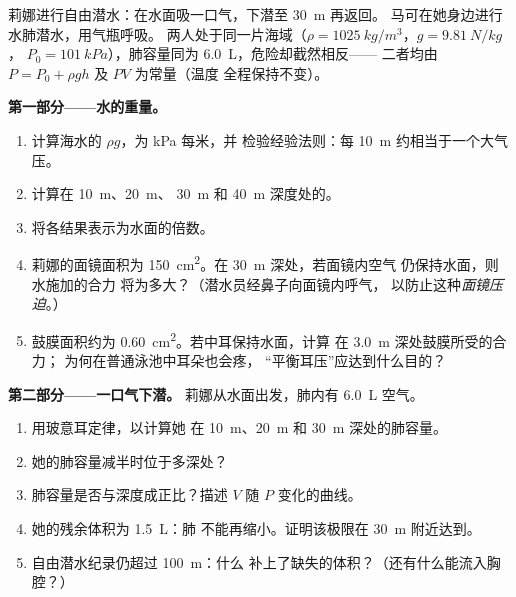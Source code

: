 \begin{problem}
\label{pb:g10:pressure:1}
莉娜进行自由潜水：在水面吸一口气，下潜至 \qty{30}{m} 再返回。
马可在她身边进行水肺潜水，用气瓶呼吸。
两人处于同一片海域（$\rho = \qty{1025}{kg/m^3}$，$g = \qty{9.81}{N/kg}$，
$P_0 = \qty{101}{kPa}$），肺容量同为 \qty{6.0}{L}，危险却截然相反——
二者均由 $P = P_0 + \rho g h$ 及 $PV$ 为常量（温度
全程保持不变）。

\medskip
\noindent\textbf{第一部分——水的重量。}
\begin{enumerate}
  \item 计算海水的 $\rho g$，为 \unit{kPa} 每米，并
        检验经验法则：每 \qty{10}{m} 约相当于一个大气压。
  \item 计算在 \qty{10}{m}、\qty{20}{m}、
        \qty{30}{m} 和 \qty{40}{m} 深度处的。
  \item 将各结果表示为水面的倍数。
  \item 莉娜的面镜面积为 \qty{150}{cm^2}。在 \qty{30}{m} 深处，若面镜内空气
        仍保持水面，则水施加的合力
        将为多大？（潜水员经鼻子向面镜内呼气，
        以防止这种\emph{面镜压迫}。）
  \item 鼓膜面积约为 \qty{0.60}{cm^2}。若中耳保持水面，计算
        在 \qty{3.0}{m} 深处鼓膜所受的合力；
        为何在普通泳池中耳朵也会疼，
        “平衡耳压”应达到什么目的？
\end{enumerate}

\medskip
\noindent\textbf{第二部分——一口气下潜。}
莉娜从水面出发，肺内有 \qty{6.0}{L} 空气。
\begin{enumerate}[resume]
  \item 用玻意耳定律，以计算她
        在 \qty{10}{m}、\qty{20}{m} 和 \qty{30}{m} 深处的肺容量。
  \item 她的肺容量减半时位于多深处？
  \item 肺容量是否与深度成正比？描述
        $V$ 随 $P$ 变化的曲线。
  \item 她的残余体积为 \qty{1.5}{L}：肺
        不能再缩小。证明该极限在 \qty{30}{m} 附近达到。
  \item 自由潜水纪录仍超过 \qty{100}{m}：什么
        补上了缺失的体积？（还有什么能流入胸腔？）
\end{enumerate}


\end{problem}
